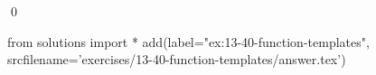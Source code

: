 
\begin{ex}
  \label{ex:13-40-function-templates}
  
  \qed
\end{ex}
\begin{python0}
from solutions import *
add(label="ex:13-40-function-templates",
    srcfilename='exercises/13-40-function-templates/answer.tex')
\end{python0}
